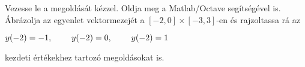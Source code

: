Vezesse le a 
\de{} megoldását kézzel. 
Oldja meg a Matlab/Octave   segítségével is. 
Ábrázolja az egyenlet vektormezejét a $[-2,0]\times [-3,3]$-en és rajzoltassa rá 
az 
\centerline{$y(-2)=-1, \hspace{0.8cm} y(-2)=0, \hspace{0.8cm} y(-2)=1$} 
kezdeti értékekhez tartozó megoldásokat is.


